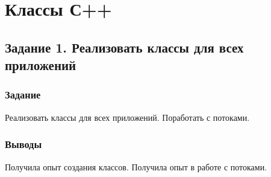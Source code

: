 \documentclass[12pt,a4paper]{report}
\begin{document}
%

\chapter{Классы С++}
\section{Задание 1. Реализовать классы для всех приложений}
\subsection{Задание}
\hspace{\parindent}
Реализовать классы для всех приложений. Поработать с потоками.
\subsection{Выводы}
\hspace{\parindent}
Получила опыт создания классов. Получила опыт в работе с потоками.
\end{document}
